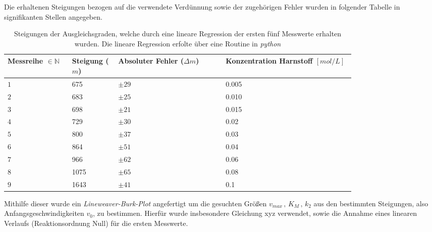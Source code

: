 Die erhaltenen Steigungen bezogen auf die verwendete Verdünnung sowie der zugehörigen Fehler wurden in folgender Tabelle in signifikanten Stellen angegeben.
\begin{table}[H]
\centering
\label{Steigungstabelle}
	\caption{Steigungen der Ausgleichsgraden, welche durch eine lineare Regression der ersten fünf Messwerte erhalten wurden. Die lineare Regression erfolte über eine Routine in \textit{python}}
	\begin{tabular}{C{0.15\linewidth}|C{0.1\linewidth}C{0.25\linewidth}C{0.3\linewidth}}
		Messreihe $\in \mathbb{N}$ &  Steigung ($m$) &  Absoluter Fehler ($\Delta m$) & Konzentration Harnstoff $\si{[mol/L]}$ \\
		\hline \addlinespace[1ex] 
		$ 1$ & 675 & $\pm 29$ & 0.005\\
		$2$ & 683& $ \pm 25$ &0.010\\
		$3$ & 698& $\pm 21$ &0.015\\
		$4$ &729& $\pm 30$&0.02\\
		$5$&  800&  $\pm 37$ &0.03\\
		$6$&  864&  $\pm 51$&0.04\\
		$7$ &  966&$\pm 62$&0.06\\
		$8$ & 1075&$\pm  65$ &0.08\\
		$9$ &  1643& $\pm 41$ &0.1\\
	\end{tabular}
\end{table}
Mithilfe dieser wurde ein \textit{Lineweaver-Burk-Plot} angefertigt um die gesuchten Größen $v_{max}\, , \, K_M\, ,\, k_2$ aus den bestimmten Steigungen, also Anfangsgeschwindigkeiten $v_0$, zu bestimmen. Hierfür wurde insbesondere Gleichung xyz verwendet, sowie die Annahme eines linearen Verlaufs (Reaktionsordnung Null) für die ersten Messwerte.



